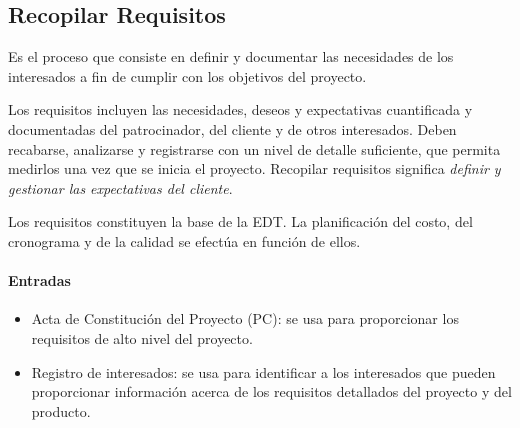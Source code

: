 \documentclass[a4paper,twosides]{article}
\newlength{\wideitemsep}
\let\olditem\item
\renewcommand{\item}{\setlength{\itemsep}{\wideitemsep}\olditem}
\begin{document}
\subsection{Recopilar Requisitos} \label{sec:recopilar_requisitos}
\par Es el proceso que consiste en definir y documentar las necesidades de los interesados a fin de cumplir con los objetivos del proyecto.
\par Los requisitos incluyen las necesidades, deseos y expectativas cuantificada y documentadas del patrocinador, del cliente y de otros interesados. Deben recabarse, analizarse y registrarse con un nivel de detalle suficiente, que permita medirlos una vez que se inicia el proyecto. Recopilar requisitos significa \emph{definir y gestionar las expectativas del cliente}.
\par Los requisitos constituyen la base de la EDT. La planificación del costo, del cronograma y de la calidad se efectúa en función de ellos.
\paragraph{Entradas}
\begin{itemize}
\item Acta de Constitución del Proyecto (PC): se usa para proporcionar los requisitos de alto nivel del proyecto.
\item Registro de interesados: se usa para identificar a los interesados que pueden proporcionar información acerca de los requisitos detallados del proyecto y del producto.
\end{itemize}
\end{document}

